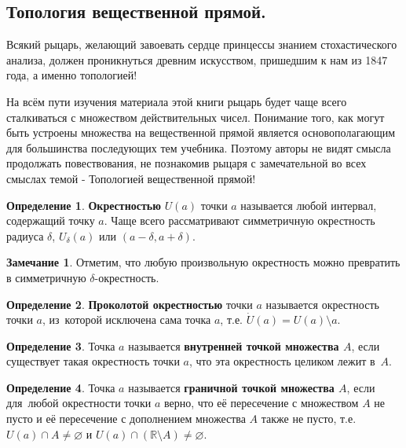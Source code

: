 \documentclass[pdftex, 12pt, a4paper]{article}
\def\R{\ensuremath{\mathbb{R}}} %
\def \dt{\delta}
\theoremstyle{definition} %
\newtheorem*{mydef}{Определение}
\newtheorem*{rem}{Замечание}
\numberwithin{problem}{section}
\newcommand{\indef}[1]{\textbf{#1}}
\numberwithin{blits}{section}
\begin{document}
\subsection{Топология вещественной прямой.}

Всякий рыцарь, желающий завоевать сердце принцессы знанием  стохастического анализа, должен проникнуться древним искусством, пришедшим к нам из 1847 года, а именно топологией!

На всём пути изучения материала этой книги рыцарь будет чаще всего сталкиваться с множеством действительных чисел. Понимание того, как могут быть устроены множества на вещественной прямой является основополагающим для большинства последующих тем учебника. Поэтому авторы не видят смысла продолжать повествования, не познакомив рыцаря с замечательной во всех смыслах темой - Топологией вещественной прямой!

\begin{mydef} \indef{Окрестностью}   $U(a)$ точки $a$ называется любой интервал, содержащий точку $a$. Чаще всего рассматривают симметричную окрестность радиуса $\dt$, $U_{\dt} (a)$ или $(a-\dt,a+\dt)$.
\end{mydef}

\begin{rem}
Отметим, что любую произвольную окрестность можно превратить в симметричную $\dt$-окрестность.
\end{rem}

\begin{mydef}
 \indef{Проколотой окрестностью}   точки $a$ называется окрестность точки $a$, из~которой исключена сама точка $a$, т.е. $\dot U(a) = U(a) \setminus a.$
\end{mydef}

\begin{mydef} Точка $a$ называется \indef{внутренней точкой множества $A$},  если существует такая окрестность точки $a$, что эта окрестность целиком лежит в~$A$.
\end{mydef}

\begin{mydef} Точка $a$ называется \indef{граничной точкой множества $A$},   если для~любой окрестности точки $a$ верно, что её пересечение с множеством $A$ не пусто и её пересечение с дополнением множества $A$ также не пусто, т.е.
$U(a) \cap A \ne \varnothing $ и $U(a) \cap (\R \setminus A)\ne \varnothing$.
\end{mydef}
\end{document}
